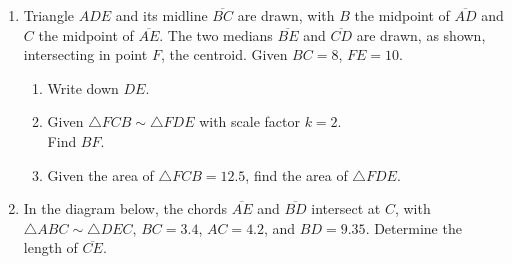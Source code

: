 \begin{enumerate}
\item Triangle $ADE$ and its midline $\overline{BC}$ are drawn, with $B$ the midpoint of $\overline{AD}$ and $C$ the midpoint of $\overline{AE}$. The two medians $\overline{BE}$ and $\overline{CD}$ are drawn, as shown, intersecting in point $F$, the centroid. Given $BC=8$, $FE=10$.
\begin{multicols}{2}
  \begin{enumerate}[itemsep=1.5cm]
    \item Write down $DE$.
    \item Given $\triangle FCB \sim \triangle FDE$ with scale factor $k=2$. \\[0.5cm]
     Find $BF$.
     \item Given the area of $\triangle FCB = 12.5$, find the area of $\triangle FDE$.
  \end{enumerate}
  \begin{center}
  \end{center}
\end{multicols}
 \vspace{1cm}

\newpage
\item In the diagram below, the chords $\overline{AE}$ and $\overline{BD}$ intersect at $C$, with $\triangle ABC \sim \triangle DEC$, $BC=3.4$, $AC=4.2$, and $BD=9.35$. Determine the length of $\overline{CE}$.
    \begin{center}
  \end{center} \vspace{2cm}


\end{enumerate}
